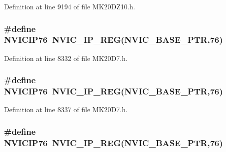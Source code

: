 Definition at line 9194 of file M\+K20\+D\+Z10.\+h.

\subsubsection[{\texorpdfstring{N\+V\+I\+C\+I\+P76}{NVICIP76}}]{\setlength{\rightskip}{0pt plus 5cm}\#define N\+V\+I\+C\+I\+P76~{\bf N\+V\+I\+C\+\_\+\+I\+P\+\_\+\+R\+EG}({\bf N\+V\+I\+C\+\_\+\+B\+A\+S\+E\+\_\+\+P\+TR},76)}\hypertarget{group___n_v_i_c___register___accessor___macros_ga9128e85c234bfb407f72a59902511bdc}{}\label{group___n_v_i_c___register___accessor___macros_ga9128e85c234bfb407f72a59902511bdc}


Definition at line 8332 of file M\+K20\+D7.\+h.

\subsubsection[{\texorpdfstring{N\+V\+I\+C\+I\+P76}{NVICIP76}}]{\setlength{\rightskip}{0pt plus 5cm}\#define N\+V\+I\+C\+I\+P76~{\bf N\+V\+I\+C\+\_\+\+I\+P\+\_\+\+R\+EG}({\bf N\+V\+I\+C\+\_\+\+B\+A\+S\+E\+\_\+\+P\+TR},76)}\hypertarget{group___n_v_i_c___register___accessor___macros_ga9128e85c234bfb407f72a59902511bdc}{}\label{group___n_v_i_c___register___accessor___macros_ga9128e85c234bfb407f72a59902511bdc}


Definition at line 8337 of file M\+K20\+D7.\+h.

\subsubsection[{\texorpdfstring{N\+V\+I\+C\+I\+P76}{NVICIP76}}]{\setlength{\rightskip}{0pt plus 5cm}\#define N\+V\+I\+C\+I\+P76~{\bf N\+V\+I\+C\+\_\+\+I\+P\+\_\+\+R\+EG}({\bf N\+V\+I\+C\+\_\+\+B\+A\+S\+E\+\_\+\+P\+TR},76)}\hypertarget{group___n_v_i_c___register___accessor___macros_ga9128e85c234bfb407f72a59902511bdc}{}\label{group___n_v_i_c___register___accessor___macros_ga9128e85c234bfb407f72a59902511bdc}


